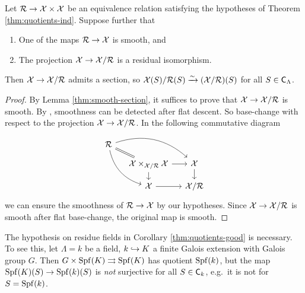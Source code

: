 \begin{corollary}\label{thm:quotients-good}
Let $\mathcal{R}\to \mathcal{X}\times \mathcal{X}$ be an equivalence relation satisfying the hypotheses 
of Theorem \ref{thm:quotients-ind}. Suppose further that 
\begin{enumerate}
\item
One of the maps $\mathcal{R}\to \mathcal{X}$ is smooth, and 

\item
The projection $\mathcal{X}\to \mathcal{X}/\mathcal{R}$ is a residual isomorphism. 
\end{enumerate}
Then $\mathcal{X}\to \mathcal{X}/\mathcal{R}$ admits a section, so $\mathcal{X}(S)/\mathcal{R}(S)\xrightarrow\sim (\mathcal{X}/\mathcal{R})(S)$ 
for all $S\in \mathsf{C}_\Lambda$. 
\end{corollary}
\begin{proof}
By Lemma \ref{thm:smooth-section}, it suffices to prove that $\mathcal{X}\to \mathcal{X}/\mathcal{R}$ 
is smooth. By \cite[17.7.3(ii)]{ega4-4}, smoothness can be detected after flat 
descent. So base-change with respect to the projection $\mathcal{X}\to \mathcal{X}/\mathcal{R}$. In the 
following commutative diagram 
\[
\begin{tikzcd}[column sep=small, row sep=small]
	\cR \ar[dr, equal] \ar[drr, bend left] \ar[ddr, bend right] \\
	& \cX\times_{\cX/\cR}\cX \ar[r] \ar[d]
		& \cX \ar[d] \\
	& \cX \ar[r]
		& \cX/\cR
\end{tikzcd}
\]
we can ensure the smoothness of $\mathcal{R}\to \mathcal{X}$ by our hypotheses. Since  
$\mathcal{X}\to \mathcal{X}/\mathcal{R}$ is smooth after flat base-change, the original map is smooth. 
\end{proof}

\begin{example}
The hypothesis on residue fields in Corollary \ref{thm:quotients-good} is 
necessary. To 
see this, let $\Lambda=k$ be a field, $k\hookrightarrow K$ a finite Galois extension 
with Galois group $G$. Then $G\times \operatorname{Spf}(K)\rightrightarrows \operatorname{Spf}(K)$ has 
quotient $\operatorname{Spf}(k)$, but the map $\operatorname{Spf}(K)(S)\to \operatorname{Spf}(k)(S)$ is \emph{not} 
surjective for all $S\in \mathsf{C}_k$, e.g.~it is not for $S=\operatorname{Spf}(k)$. 
\end{example}

